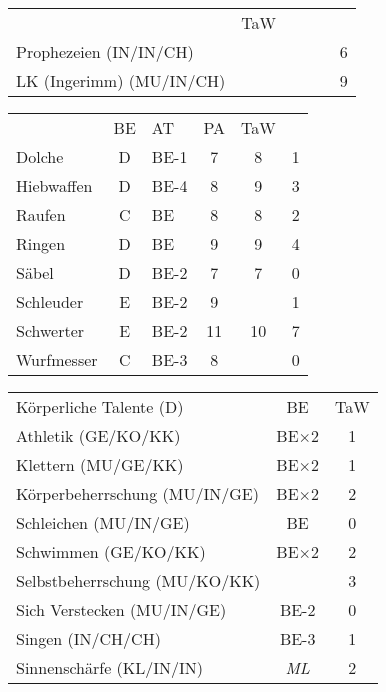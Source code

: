 \documentclass{article}
\newcommand{\tawLk}{9}
\newcommand{\tawPr}{6}
\begin{document}
  \begin{table}[ht]
    \centering
    \begin{tabularx}{0.8\linewidth}{|Xclcc|c|}
      \hline
      \rowcolor{gray}\multicolumn{5}{|l|}{Gabe (F)}&TaW\\
      \rowcolor{white} Prophezeien (IN/IN/CH) &&&&& \tawPr\\
      \rowcolor{white} LK (Ingerimm) (MU/IN/CH) &&&&& \tawLk\\
      \hline
    \end{tabularx}
    \centering
    \begin{tabularx}{0.8\linewidth}{|Xclcc|c|}
      \hline
      \rowcolor{gray} \multicolumn{2}{|l}{Kampftechniken}& BE & AT & PA &TaW\\ 
      \rowcolor{white}Dolche& D& BE-1& 7& 8& 1 \\
      \rowcolor{white}Hiebwaffen& D& BE-4& 8& 9& 3 \\
      \rowcolor{white}Raufen&C&BE&8&8&2\\ 
      \rowcolor{white}Ringen&D&BE&9&9&4\\ 
      \rowcolor{white}Säbel&D&BE-2&7&7&0\\ 
      \rowcolor{white}Schleuder&E&BE-2&9&&1\\ 
      \rowcolor{white}Schwerter&E&BE-2&11&10&7\\ 
      \rowcolor{white}Wurfmesser&C&BE-3&8&&0\\
      \hline
    \end{tabularx}
    \centering
    \begin{tabularx}{0.8\linewidth}{|Xc|c|}
      \hline
      \rowcolor{gray}  Körperliche Talente (D)& BE &TaW\\
      \rowcolor{white} Athletik (GE/KO/KK)& BE$\times$2 & 1\\
      \rowcolor{white} Klettern (MU/GE/KK)& BE$\times$2 & 1\\
      \rowcolor{white} Körperbeherrschung (MU/IN/GE) & BE$\times$2& 2\\
      \rowcolor{white} Schleichen (MU/IN/GE) & BE& 0\\
      \rowcolor{white} Schwimmen (GE/KO/KK) & BE$\times$2& 2\\
      \rowcolor{white} Selbstbeherrschung (MU/KO/KK)& & 3\\
      \rowcolor{white} Sich Verstecken (MU/IN/GE)&  BE-2&0\\
      \rowcolor{white} Singen (IN/CH/CH)& BE-3& 1\\
      \rowcolor{white} Sinnenschärfe (KL/IN/IN)& \emph{ML}&2\\

\end{tabularx}
\end{table}
\end{document}
